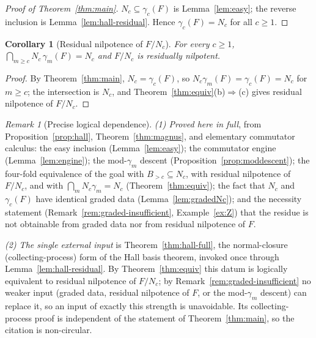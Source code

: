 \documentclass{amsart}
\newtheorem{corollary}{Corollary}
\theoremstyle{definition}
\theoremstyle{remark}
\newtheorem{remark}{Remark}
\begin{document}
\begin{proof}[Proof of Theorem~\ref{thm:main}]
$N_c\subseteq\gamma_c(F)$ is Lemma~\ref{lem:easy}; the reverse inclusion is
Lemma~\ref{lem:hall-residual}. Hence $\gamma_c(F)=N_c$ for all $c\ge1$.
\end{proof}

\begin{corollary}[Residual nilpotence of $F/N_c$]\label{cor:resnil}
For every $c\ge1$, $\bigcap_{m\ge c}N_c\,\gamma_m(F)=N_c$ and $F/N_c$ is residually
nilpotent.
\end{corollary}

\begin{proof}
By Theorem~\ref{thm:main}, $N_c=\gamma_c(F)$, so $N_c\gamma_m(F)=\gamma_c(F)=N_c$
for $m\ge c$; the intersection is $N_c$, and
Theorem~\ref{thm:equiv}(b)$\Rightarrow$(c) gives residual nilpotence of $F/N_c$.
\end{proof}

\begin{remark}[Precise logical dependence]\label{rem:noncircular}
\emph{(1) Proved here in full}, from Proposition~\ref{prop:hall},
Theorem~\ref{thm:magnus}, and elementary commutator calculus: the easy inclusion
(Lemma~\ref{lem:easy}); the commutator engine (Lemma~\ref{lem:engine}); the
mod-$\gamma_m$ descent (Proposition~\ref{prop:moddescent}); the four-fold
equivalence of the goal with $B_{>c}\subseteq N_c$, with residual nilpotence of
$F/N_c$, and with $\bigcap_m N_c\gamma_m=N_c$ (Theorem~\ref{thm:equiv}); the fact
that $N_c$ and $\gamma_c(F)$ have identical graded data (Lemma~\ref{lem:gradedNc});
and the necessity statement (Remark~\ref{rem:graded-insufficient},
Example~\ref{ex:Z}) that the residue is not obtainable from graded data nor from
residual nilpotence of $F$.

\emph{(2) The single external input} is Theorem~\ref{thm:hall-full}, the
normal-closure (collecting-process) form of the Hall basis theorem, invoked once
through Lemma~\ref{lem:hall-residual}. By Theorem~\ref{thm:equiv} this datum is
logically equivalent to residual nilpotence of $F/N_c$; by
Remark~\ref{rem:graded-insufficient} no weaker input (graded data, residual
nilpotence of $F$, or the mod-$\gamma_m$ descent) can replace it, so an input of
exactly this strength is unavoidable. Its collecting-process proof is independent of
the statement of Theorem~\ref{thm:main}, so the citation is non-circular.
\end{remark}
\end{document}
